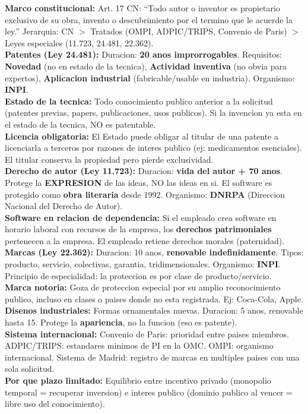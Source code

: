 \documentclass[10pt, a4paper]{article}
\newcommand{\D}[2]{\textbf{\color{azul}#1:} #2\\[1pt]}
\newcommand{\alerta}[1]{\textbf{\color{naranja}#1}}
\begin{document}
\begin{cajaClave}
\D{Marco constitucional}{Art. 17 CN: ``Todo autor o inventor es propietario exclusivo de su obra, invento o descubrimiento por el termino que le acuerde la ley.'' Jerarquia: CN $>$ Tratados (OMPI, ADPIC/TRIPS, Convenio de Paris) $>$ Leyes especiales (11.723, 24.481, 22.362).}
\D{Patentes (Ley 24.481)}{Duracion: \alerta{20 anos improrrogables}. Requisitos: \textbf{Novedad} (no en estado de la tecnica), \textbf{Actividad inventiva} (no obvia para expertos), \textbf{Aplicacion industrial} (fabricable/usable en industria). Organismo: \textbf{INPI}.}
\D{Estado de la tecnica}{Todo conocimiento publico anterior a la solicitud (patentes previas, papers, publicaciones, usos publicos). Si la invencion ya esta en el estado de la tecnica, NO es patentable.}
\D{Licencia obligatoria}{El Estado puede obligar al titular de una patente a licenciarla a terceros por razones de interes publico (ej: medicamentos esenciales). El titular conserva la propiedad pero pierde exclusividad.}
\D{Derecho de autor (Ley 11.723)}{Duracion: \alerta{vida del autor + 70 anos}. Protege la \textbf{EXPRESION} de las ideas, NO las ideas en si. El software es protegido como \textbf{obra literaria} desde 1992. Organismo: \textbf{DNRPA} (Direccion Nacional del Derecho de Autor).}
\D{Software en relacion de dependencia}{Si el empleado crea software en horario laboral con recursos de la empresa, los \textbf{derechos patrimoniales} pertenecen a la empresa. El empleado retiene derechos morales (paternidad).}
\D{Marcas (Ley 22.362)}{Duracion: 10 anos, \textbf{renovable indefinidamente}. Tipos: producto, servicio, colectivas, garantia, tridimensionales. Organismo: \textbf{INPI}. Principio de especialidad: la proteccion es por clase de producto/servicio.}
\D{Marca notoria}{Goza de proteccion especial por su amplio reconocimiento publico, incluso en clases o paises donde no esta registrada. Ej: Coca-Cola, Apple.}
\D{Disenos industriales}{Formas ornamentales nuevas. Duracion: 5 anos, renovable hasta 15. Protege la \textbf{apariencia}, no la funcion (eso es patente).}
\D{Sistema internacional}{Convenio de Paris: prioridad entre paises miembros. ADPIC/TRIPS: estandares minimos de PI en la OMC. OMPI: organismo internacional. Sistema de Madrid: registro de marcas en multiples paises con una sola solicitud.}
\D{Por que plazo limitado}{Equilibrio entre incentivo privado (monopolio temporal = recuperar inversion) e interes publico (dominio publico al vencer = libre uso del conocimiento).}
\end{cajaClave}
\end{document}
